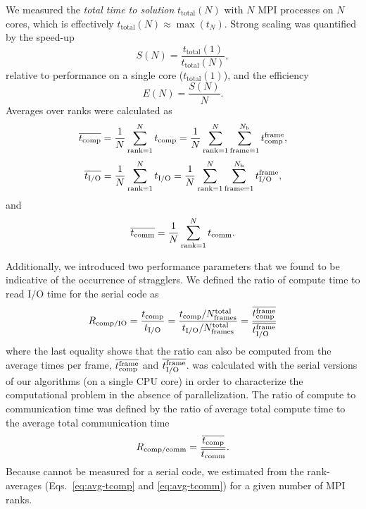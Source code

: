 We measured the \emph{total time to solution} $t_{\text{total}}(N)$ with $N$ MPI processes on $N$ cores, which is effectively
$t_{\text{total}}(N) \approx \max(t_{N})$. 
Strong scaling was quantified by the speed-up
\begin{equation}
  \label{eq:speedup}
  S(N) = \frac{t_{\text{total}}(1)}{t_{\text{total}}(N)},
\end{equation}
relative to performance on a single core ($t_{\text{total}}(1)$), and the efficiency
\begin{equation}
  \label{eq:efficiency}
  E(N) = \frac{S(N)}{N}.
\end{equation}
Averages over ranks were calculated as
\begin{equation}
  \label{eq:avg-tcomp}
  \overline{{t}_{\text{comp}}} = \frac{1}{N}
  \sum_{\text{rank}=1}^{N}{t}_{\text{comp}} = \frac{1}{N}\sum_{\text{rank}=1}^{N}\sum_{\text{frame}=1}^{N_\text{b}}{t}_{\text{comp}}^{\text{frame}},
\end{equation}
\begin{equation}
  \label{eq:avg-tIO}
  \overline{{t}_{\text{I/O}}} = \frac{1}{N}\sum_{\text{rank}=1}^{N}{t}_{\text{I/O}} = \frac{1}{N}\sum_{\text{rank}=1}^{N}\sum_{\text{frame}=1}^{N_{\text{b}}}{t}_{\text{I/O}}^{\text{frame}},
\end{equation}
and
\begin{equation}
  \label{eq:avg-tcomm}
  \overline{t_{\text{comm}}} = \frac{1}{N}\sum_{\text{rank}=1}^{N}t_{\text{comm}}.
\end{equation}

Additionally, we introduced two performance parameters that we found to be indicative of the occurrence of stragglers.
We defined the ratio of compute time to read I/O time for the serial code as
\begin{equation}
  \label{eq:Compute-IO}  
  \RcompIO = \frac{\tcomp}{\tIO} = %
  \frac{\tcomp/N_{\text{frames}}^{\text{total}}}{\tIO/N_{\text{frames}}^{\text{total}}}  = %
  \frac{\overline{\tcomp^{\text{frame}}}}{\overline{\tIO^{\text{frame}}}}  
\end{equation}
where the last equality shows that the ratio can also be computed from the average times per frame, $\overline{{t}_{\text{comp}}^{\text{frame}}}$ and $\overline{{t}_{\text{I/O}}^{\text{frame}}}$.
\RcompIO was calculated with the serial versions of our algorithms (on a single CPU core) in order to characterize the computational problem in the absence of parallelization.
The ratio of compute to communication time was defined by the ratio of average total compute time to the average total communication time   
\begin{equation}
  \label{eq:Compute-comm}
  R_{\text{comp/comm}} = \frac{\overline{{t}_{\text{comp}}}}{\overline{t_{\text{comm}}}}.
\end{equation}
Because \tcomm cannot be measured for a serial code, we estimated \Rcompcomm from the rank-averages (Eqs.~\ref{eq:avg-tcomp} and \ref{eq:avg-tcomm}) for a given number of MPI ranks.


